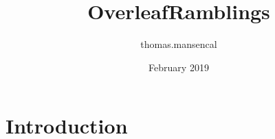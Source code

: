 \documentclass{article}
\title{OverleafRamblings}
\author{thomas.mansencal }
\date{February 2019}
\begin{document}
\maketitle

\section{Introduction}
\end{document}
